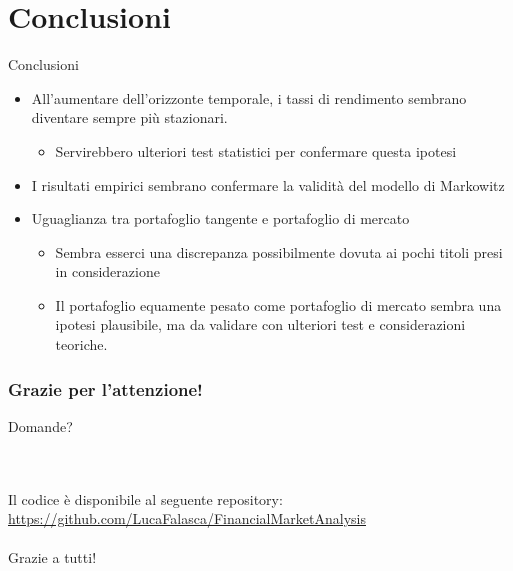 \documentclass[compress]{beamer}
\begin{document}
\section{Conclusioni}

\begin{frame}{Conclusioni}
	\begin{itemize}
		\item All'aumentare dell'orizzonte temporale, i tassi di rendimento sembrano diventare sempre più stazionari.
		\begin{itemize}
			\item Servirebbero ulteriori test statistici per confermare questa ipotesi
		\end{itemize}
		\item I risultati empirici sembrano confermare la validità del modello di Markowitz
		\item Uguaglianza tra portafoglio tangente e portafoglio di mercato
		\begin{itemize}
			\item Sembra esserci una discrepanza possibilmente dovuta ai pochi titoli presi in considerazione
			\item Il portafoglio equamente pesato come portafoglio di mercato sembra una ipotesi plausibile, ma da validare con ulteriori test e considerazioni teoriche.
		\end{itemize}
	\end{itemize}	
\end{frame}
\begin{frame}
	\frametitle{Grazie per l'attenzione!}
	\begin{Huge}
		Domande?
	\end{Huge} 
	\\ \\
	Il codice è disponibile al seguente repository: \url{https://github.com/LucaFalasca/FinancialMarketAnalysis}
	\\ \\
	Grazie a tutti!
	
\end{frame}
\end{document}
